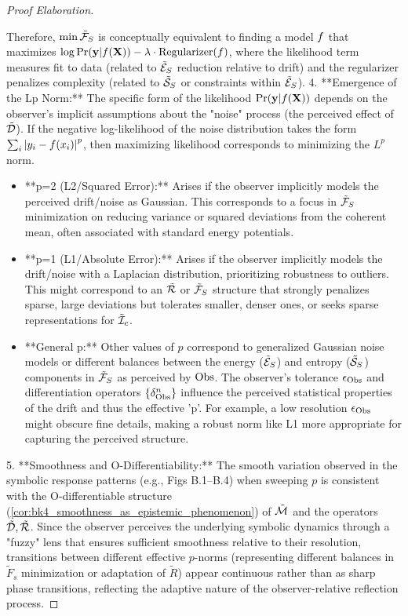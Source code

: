 \begin{proof}[Proof Elaboration]
\begin{itemize}
    \end{itemize}
    Therefore, \( \min \tilde{\mathcal{F}}_S \) is conceptually equivalent to finding a model \( f \) that maximizes \( \log \mathrm{Pr}(\mathbf{y} | f(\mathbf{X})) - \lambda \cdot \text{Regularizer}(f) \), where the likelihood term measures fit to data (related to \( \tilde{\mathcal{E}}_S \) reduction relative to drift) and the regularizer penalizes complexity (related to \( \tilde{\mathcal{S}}_S \) or constraints within \( \tilde{\mathcal{E}}_S \)).
4.  **Emergence of the Lp Norm:** The specific form of the likelihood \( \mathrm{Pr}(\mathbf{y} | f(\mathbf{X})) \) depends on the observer's implicit assumptions about the "noise" process (the perceived effect of \( \tilde{\mathcal{D}} \)). If the negative log-likelihood of the noise distribution takes the form \( \sum_i \left|y_i - f(x_i)\right|^p \), then maximizing likelihood corresponds to minimizing the \( L^p \) norm.
    \begin{itemize}
        \item **p=2 (L2/Squared Error):** Arises if the observer implicitly models the perceived drift/noise as Gaussian. This corresponds to a focus in \( \tilde{\mathcal{F}}_S \) minimization on reducing variance or squared deviations from the coherent mean, often associated with standard energy potentials.
        \item **p=1 (L1/Absolute Error):** Arises if the observer implicitly models the drift/noise with a Laplacian distribution, prioritizing robustness to outliers. This might correspond to an \( \tilde{\mathcal{R}} \) or \( \tilde{\mathcal{F}}_S \) structure that strongly penalizes sparse, large deviations but tolerates smaller, denser ones, or seeks sparse representations for \( \tilde{\mathcal{I}}_c \).
        \item **General p:** Other values of \( p \) correspond to generalized Gaussian noise models or different balances between the energy (\( \tilde{\mathcal{E}}_S \)) and entropy (\( \tilde{\mathcal{S}}_S \)) components in \( \tilde{\mathcal{F}}_S \) as perceived by \( \mathrm{Obs} \). The observer's tolerance \( \epsilon_{\mathrm{Obs}} \) and differentiation operators \( \{\delta^n_{\mathrm{Obs}}\} \) influence the perceived statistical properties of the drift and thus the effective 'p'. For example, a low resolution \( \epsilon_{\mathrm{Obs}} \) might obscure fine details, making a robust norm like L1 more appropriate for capturing the perceived structure.
    \end{itemize}
5. **Smoothness and O-Differentiability:** The smooth variation observed in the symbolic response patterns (e.g., Figs B.1–B.4) when sweeping \( p \) is consistent with the O-differentiable structure (\ref{cor:bk4_smoothness_as_epistemic_phenomenon}) of \( \tilde{\mathcal{M}} \) and the operators \( \tilde{\mathcal{D}}, \tilde{\mathcal{R}} \). Since the observer perceives the underlying symbolic dynamics through a "fuzzy" lens that ensures sufficient smoothness relative to their resolution, transitions between different effective \( p \)-norms (representing different balances in \( \tilde{F}_s \) minimization or adaptation of \( \tilde{R} \)) appear continuous rather than as sharp phase transitions, reflecting the adaptive nature of the observer-relative reflection process.

\end{proof}
